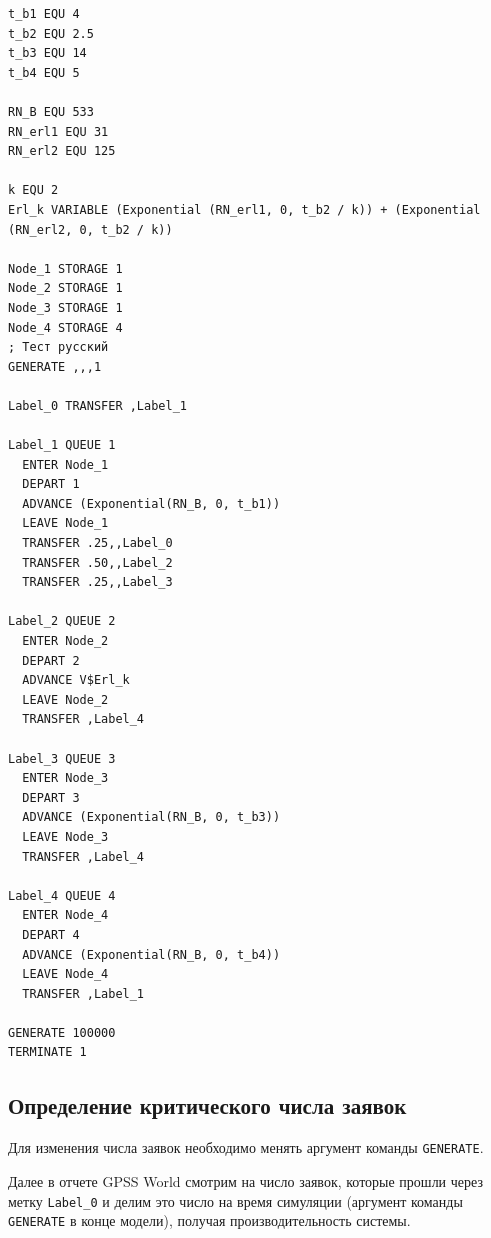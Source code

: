 \documentclass{article}
\begin{document}
\begin{lstlisting}
t_b1 EQU 4
t_b2 EQU 2.5
t_b3 EQU 14
t_b4 EQU 5

RN_B EQU 533
RN_erl1 EQU 31
RN_erl2 EQU 125

k EQU 2
Erl_k VARIABLE (Exponential (RN_erl1, 0, t_b2 / k)) + (Exponential (RN_erl2, 0, t_b2 / k))

Node_1 STORAGE 1
Node_2 STORAGE 1
Node_3 STORAGE 1
Node_4 STORAGE 4
; Тест русский
GENERATE ,,,1

Label_0 TRANSFER ,Label_1

Label_1 QUEUE 1
  ENTER Node_1
  DEPART 1
  ADVANCE (Exponential(RN_B, 0, t_b1))
  LEAVE Node_1
  TRANSFER .25,,Label_0
  TRANSFER .50,,Label_2
  TRANSFER .25,,Label_3

Label_2 QUEUE 2
  ENTER Node_2
  DEPART 2
  ADVANCE V$Erl_k
  LEAVE Node_2
  TRANSFER ,Label_4

Label_3 QUEUE 3
  ENTER Node_3
  DEPART 3
  ADVANCE (Exponential(RN_B, 0, t_b3))
  LEAVE Node_3
  TRANSFER ,Label_4

Label_4 QUEUE 4
  ENTER Node_4
  DEPART 4
  ADVANCE (Exponential(RN_B, 0, t_b4))
  LEAVE Node_4
  TRANSFER ,Label_1

GENERATE 100000
TERMINATE 1
\end{lstlisting}

\subsection{Определение критического числа заявок}

Для изменения числа заявок необходимо менять аргумент команды \texttt{GENERATE}.

Далее в отчете GPSS World смотрим на число заявок, которые прошли через метку \texttt{Label\_0} и делим это число на время симуляции (аргумент команды \texttt{GENERATE} в конце модели), получая производительность системы.
\end{document}
